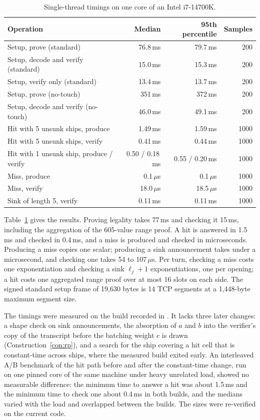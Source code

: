 \documentclass[11pt]{article}
\theoremstyle{definition}
\theoremstyle{remark}
\begin{document}
\begin{table}[t]
\centering
\begin{tabular}{@{}lrrr@{}}
\toprule
Operation & Median & 95th percentile & Samples\\
\midrule
Setup, prove (standard) & 76.8\,ms & 79.7\,ms & 200\\
Setup, decode and verify (standard) & 15.0\,ms & 15.3\,ms & 200\\
Setup, verify only (standard) & 13.4\,ms & 13.7\,ms & 200\\
Setup, prove (no-touch) & 351\,ms & 372\,ms & 200\\
Setup, decode and verify (no-touch) & 46.0\,ms & 49.1\,ms & 200\\
Hit with 5 unsunk ships, produce & 1.49\,ms & 1.59\,ms & 1000\\
Hit with 5 unsunk ships, verify & 0.41\,ms & 0.44\,ms & 1000\\
Hit with 1 unsunk ship, produce / verify & 0.50 / 0.18\,ms & 0.55 / 0.20\,ms & 1000\\
Miss, produce & 0.1\,$\mu$s & 0.1\,$\mu$s & 1000\\
Miss, verify & 18.0\,$\mu$s & 18.5\,$\mu$s & 1000\\
Sink of length 5, verify & 0.11\,ms & 0.11\,ms & 1000\\
\bottomrule
\end{tabular}
\caption{Single-thread timings on one core of an Intel i7-14700K.}
\label{tab:timings}
\end{table}

Table~\ref{tab:timings} gives the results. Proving legality takes 77\,ms and checking it 15\,ms, including the aggregation of the 605-value range proof. A hit is answered in 1.5\,ms and checked in 0.4\,ms, and a miss is produced and checked in microseconds. Producing a miss copies one scalar; producing a sink announcement takes under a microsecond, and checking one takes 54 to 107\,$\mu$s. Per turn, checking a miss costs one exponentiation and checking a sink $\ell_j+1$ exponentiations, one per opening; a hit costs one aggregated range proof over at most $16$ slots on each side. The signed standard setup frame of 19,630 bytes is 14 TCP segments at a 1,448-byte maximum segment size.

The timings were measured on the build recorded in . It lacks three later changes: a shape check on sink announcements, the absorption of $a$ and $b$ into the verifier's copy of the transcript before the batching weight $c$ is drawn (Construction~\ref{con:rp}), and a search for the ship covering a hit cell that is constant-time across ships, where the measured build exited early. An interleaved A/B benchmark of the hit path before and after the constant-time change, run on one pinned core of the same machine under heavy unrelated load, showed no measurable difference: the minimum time to answer a hit was about 1.5\,ms and the minimum time to check one about 0.4\,ms in both builds, and the medians varied with the load and overlapped between the builds. The sizes were re-verified on the current code.
\end{document}

